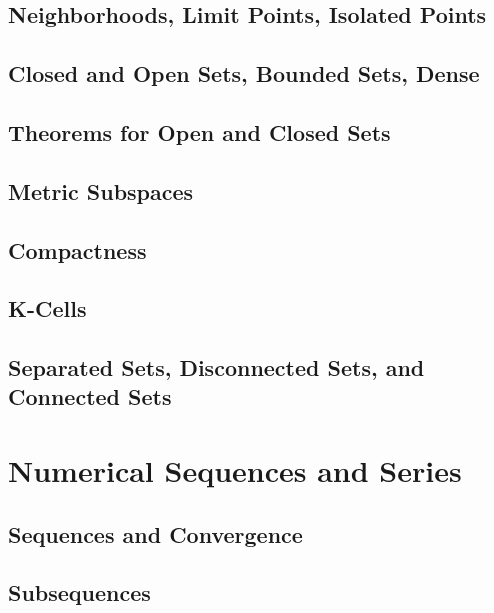 \documentclass[a4paper, openany]{book}
\begin{document}
\section{Neighborhoods, Limit Points, Isolated Points}

\newpage

\section{Closed and Open Sets, Bounded Sets, Dense}

\newpage

\section{Theorems for Open and Closed Sets}

\newpage

\section{Metric Subspaces}

\newpage

\section{Compactness}

\newpage

\section{K-Cells}

\newpage

\section{Separated Sets, Disconnected Sets, and Connected Sets}

\newpage

\chapter{Numerical Sequences and Series}
\section{Sequences and Convergence}

\newpage

\section{Subsequences}

\newpage
\end{document}
